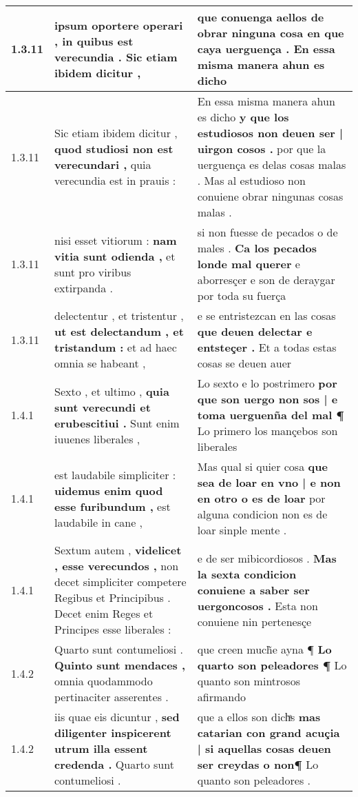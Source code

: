 \begin{tabular}{|p{1cm}|p{6.5cm}|p{6.5cm}|}
1.3.11 & ipsum oportere operari , \textbf{ in quibus est verecundia . } Sic etiam ibidem dicitur , & que conuenga aellos de obrar ninguna cosa \textbf{ en que caya uerguença . } En essa misma manera ahun es dicho \\\hline
1.3.11 & Sic etiam ibidem dicitur , \textbf{ quod studiosi non est verecundari , } quia verecundia est in prauis : & En essa misma manera ahun es dicho \textbf{ y que los estudiosos non deuen ser | uirgon cosos . } por que la uerguença es delas cosas malas . Mas al estudioso non conuiene obrar ningunas cosas malas . \\\hline
1.3.11 & nisi esset vitiorum : \textbf{ nam vitia sunt odienda , } et sunt pro viribus extirpanda . & si non fuesse de pecados o de males . \textbf{ Ca los pecados londe mal querer } e aborresçer e son de deraygar por toda su fuerça \\\hline
1.3.11 & delectentur , et tristentur , \textbf{ ut est delectandum , et tristandum : } et ad haec omnia se habeant , & e se entristezcan en las cosas \textbf{ que deuen delectar e entsteçer . } Et a todas estas cosas se deuen auer \\\hline
1.4.1 & Sexto , et ultimo , \textbf{ quia sunt verecundi et erubescitiui . } Sunt enim iuuenes liberales , & Lo sexto e lo postrimero \textbf{ por que son uergo non sos | e toma uerguenña del mal ¶ } Lo primero los mançebos son liberales \\\hline
1.4.1 & est laudabile simpliciter : \textbf{ uidemus enim quod esse furibundum , } est laudabile in cane , & Mas qual si quier cosa \textbf{ que sea de loar en vno | e non en otro o es de loar } por alguna condicion non es de loar sinple mente . \\\hline
1.4.1 & Sextum autem , \textbf{ videlicet , esse verecundos , } non decet simpliciter competere Regibus et Principibus . Decet enim Reges et Principes esse liberales : & e de ser mibicordiosos . \textbf{ Mas la sexta condicion conuiene a saber ser uergoncosos . } Esta non conuiene nin pertenesçe \\\hline
1.4.2 & Quarto sunt contumeliosi . \textbf{ Quinto sunt mendaces , } omnia quodammodo pertinaciter asserentes . & que creen much̃e ayna ¶ \textbf{ Lo quarto son peleadores ¶ } Lo quanto son mintrosos afirmando \\\hline
1.4.2 & iis quae eis dicuntur , \textbf{ sed diligenter inspicerent utrum illa essent credenda . } Quarto sunt contumeliosi . & que a ellos son dichͣs \textbf{ mas catarian con grand acuçia | si aquellas cosas deuen ser creydas o non¶ } Lo quanto son peleadores . \\\hline

\end{tabular}
